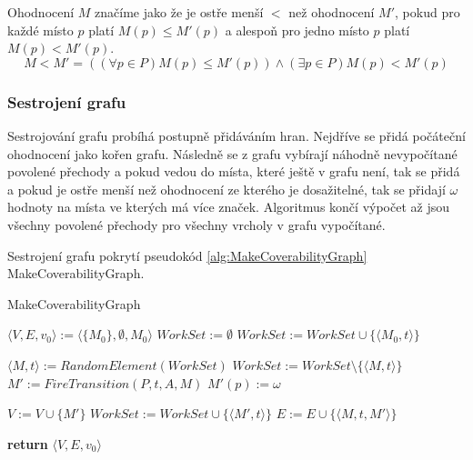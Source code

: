 \documentclass[
  biblatex,
  glossaries,
]{kidiplom}
\begin{document}
Ohodnocení $M$ značíme jako že je ostře menší $<$ než ohodnocení $M'$,
pokud pro každé místo $p$ platí $M(p) \leq M'(p)$ a alespoň pro jedno
místo $p$ platí $M(p) < M'(p)$.
$$
 M<M' = ((\forall p \in P) M(p) \leq M'(p)) \land (\exists p \in P) M(p) < M'(p)
$$

\subsubsection{Sestrojení grafu}

Sestrojování grafu probíhá postupně přidáváním hran. Nejdříve se přidá počáteční 
ohodnocení jako kořen grafu. Následně se z grafu vybírají náhodně
nevypočítané povolené přechody a pokud vedou do místa, které ještě 
v grafu není, tak se přidá a pokud je ostře menší než ohodnocení ze kterého
je dosažitelné, tak se přidají $\omega$ hodnoty na místa ve kterých má více značek.
Algoritmus končí výpočet až jsou všechny povolené 
přechody pro všechny vrcholy v grafu vypočítané.

\begin{center}
  Sestrojení grafu pokrytí pseudokód \ref{alg:MakeCoverabilityGraph} MakeCoverabilityGraph.
\end{center}

\begin{algorithm}
  \caption{MakeCoverabilityGraph}\label{alg:MakeCoverabilityGraph}
  \begin{algorithmic}[1]
    \State $\langle V,E,v_0\rangle := \langle\{M_0\},\emptyset,M_0\rangle$
    \State $WorkSet := \emptyset $
    \State $WorkSet := WorkSet \cup \{\langle M_0, t \rangle\} $
    \EndFor

    \State $\langle M, t \rangle := RandomElement(WorkSet)$
    \State $WorkSet := WorkSet \setminus \{\langle M, t \rangle\}$
    \State $M' := FireTransition(P,t,A,M)$
    \State $M'(p) := \omega$
    \EndIf
    \EndFor
    \EndFor

    \State $V := V \cup \{M'\}$
    \State $WorkSet := WorkSet \cup \{\langle M', t \rangle\} $
    \EndFor
    \EndIf
    \State $E := E \cup \{\langle M,t,M'\rangle\}$
    \EndWhile

    \State \textbf{return} $\langle V,E,v_0\rangle$
    \EndFunction
  \end{algorithmic}
\end{algorithm}
\end{document}
